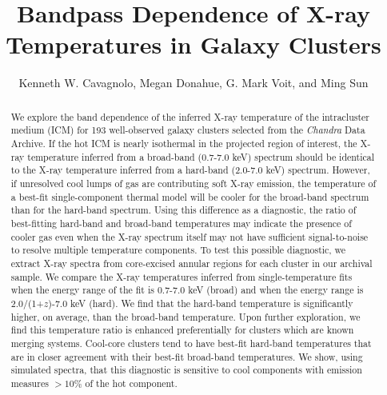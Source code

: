 \documentclass[12pt,preprint]{aastex}
\begin{document}
\title{Bandpass Dependence of X-ray Temperatures in Galaxy Clusters}
\author{Kenneth W. Cavagnolo, Megan
Donahue, G. Mark Voit, and Ming Sun}

\begin{abstract}

We explore the band dependence of the inferred X-ray temperature of
the intracluster medium (ICM) for 193 well-observed galaxy clusters
selected from the {\it Chandra} Data Archive. If
the hot ICM is nearly isothermal in the projected region
of interest, the X-ray temperature inferred from a broad-band
(0.7-7.0 keV) spectrum should be identical to the X-ray temperature
inferred from a hard-band (2.0-7.0 keV) spectrum. However, if 
unresolved cool lumps of gas are contributing soft X-ray emission, the
temperature of a best-fit single-component thermal model will be
cooler for the broad-band spectrum than for the hard-band spectrum. Using
this difference as a diagnostic, the ratio of best-fitting hard-band
and broad-band temperatures may indicate the presence of cooler gas even
when the X-ray spectrum itself may not have sufficient signal-to-noise
to resolve multiple temperature components. To test this possible
diagnostic, we extract X-ray spectra from core-excised annular regions
for each cluster in our archival sample. We compare the X-ray
temperatures inferred from single-temperature fits when the energy
range of the fit is 0.7-7.0 keV (broad) and when the energy range is
2.0/(1+$z$)-7.0 keV (hard). We find that the hard-band temperature is
significantly higher, on average, than the broad-band
temperature. Upon further exploration, we find this temperature ratio
is enhanced preferentially for clusters which are known merging
systems. Cool-core clusters tend to have best-fit hard-band
temperatures that are in closer agreement with their best-fit broad-band
temperatures. We show, using simulated spectra, that this diagnostic is
sensitive to cool components with emission measures $> 10\%$ of the
hot component.
\end{abstract}

\end{document}
